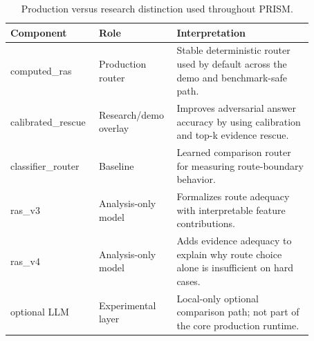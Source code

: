 \begin{table}[t]
\centering
\small
\begin{tabular}{p{0.24\linewidth}p{0.20\linewidth}p{0.43\linewidth}}
\toprule
\textbf{Component} & \textbf{Role} & \textbf{Interpretation} \\
\midrule
computed\_ras & Production router & Stable deterministic router used by default across the demo and benchmark-safe path. \\
calibrated\_rescue & Research/demo overlay & Improves adversarial answer accuracy by using calibration and top-k evidence rescue. \\
classifier\_router & Baseline & Learned comparison router for measuring route-boundary behavior. \\
ras\_v3 & Analysis-only model & Formalizes route adequacy with interpretable feature contributions. \\
ras\_v4 & Analysis-only model & Adds evidence adequacy to explain why route choice alone is insufficient on hard cases. \\
optional LLM & Experimental layer & Local-only optional comparison path; not part of the core production runtime. \\
\bottomrule
\end{tabular}
\caption{Production versus research distinction used throughout PRISM.}
\label{tab:prodresearch}
\end{table}
